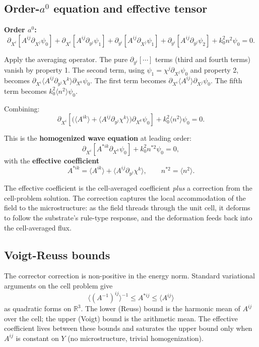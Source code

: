 \documentclass[11pt,a4paper]{article}
\begin{document}
\subsection{Order-$a^0$ equation and effective tensor}

\textbf{Order $a^0$:}
\[
\partial_{X^i}\!\left[A^{ij}\partial_{X^j}\psi_0\right] + \partial_{X^i}\!\left[A^{ij}\partial_{y^j}\psi_1\right] + \partial_{y^i}\!\left[A^{ij}\partial_{X^j}\psi_1\right] + \partial_{y^i}\!\left[A^{ij}\partial_{y^j}\psi_2\right] + k_0^2 n^2\psi_0 = 0.
\]

Apply the averaging operator. The pure $\partial_{y^i}[\cdots]$ terms (third and fourth terms) vanish by property 1. The second term, using $\psi_1 = \chi^j\partial_{X^j}\psi_0$ and property 2, becomes $\partial_{X^i}\langle A^{ij}\partial_{y^j}\chi^k\rangle\partial_{X^k}\psi_0$. The first term becomes $\partial_{X^i}\langle A^{ij}\rangle\partial_{X^j}\psi_0$. The fifth term becomes $k_0^2\langle n^2\rangle\psi_0$.

Combining:
\[
\partial_{X^i}\!\left[\big(\langle A^{ik}\rangle + \langle A^{ij}\partial_{y^j}\chi^k\rangle\big)\partial_{X^k}\psi_0\right] + k_0^2\langle n^2\rangle\psi_0 = 0.
\]

This is the \textbf{homogenized wave equation} at leading order:
\[
\partial_{X^i}\!\left[A^{*ik}\partial_{X^k}\psi_0\right] + k_0^2 n^{*2}\psi_0 = 0,
\]
with the \textbf{effective coefficient}
\[
\boxed{A^{*ik} = \langle A^{ik}\rangle + \langle A^{ij}\partial_{y^j}\chi^k\rangle, \qquad n^{*2} = \langle n^2\rangle.}
\]

The effective coefficient is the cell-averaged coefficient \emph{plus} a correction from the cell-problem solution. The correction captures the local accommodation of the field to the microstructure: as the field threads through the unit cell, it deforms to follow the substrate's rule-type response, and the deformation feeds back into the cell-averaged flux.

\subsection{Voigt-Reuss bounds}

The corrector correction is non-positive in the energy norm. Standard variational arguments on the cell problem give
\[
\langle (A^{-1})^{ij}\rangle^{-1} \le A^{*ij} \le \langle A^{ij}\rangle
\]
as quadratic forms on $\mathbb{R}^3$. The lower (Reuss) bound is the harmonic mean of $A^{ij}$ over the cell; the upper (Voigt) bound is the arithmetic mean. The effective coefficient lives between these bounds and saturates the upper bound only when $A^{ij}$ is constant on $Y$ (no microstructure, trivial homogenization).
\end{document}
